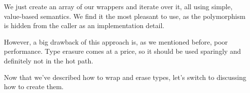 We just create an array of our wrappers and iterate over it, all using simple, value-based semantics. We find it the most pleasant to use, as the polymorphism is hidden from the caller as an implementation detail.

However, a big drawback of this approach is, as we mentioned before, poor performance. Type erasure comes at a price, so it should be used sparingly and definitely not in the hot path.

Now that we've described how to wrap and erase types, let's switch to discussing how to create them.

















